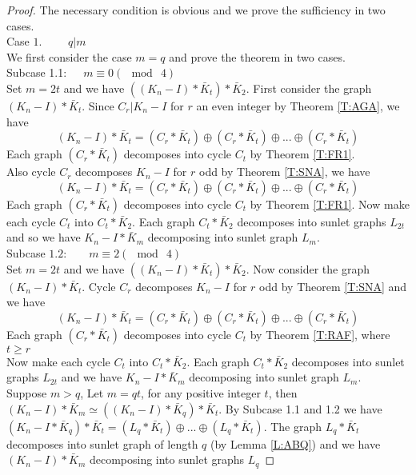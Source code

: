 \documentclass[12pt]{report}
\begin{document}
\begin{proof}
The necessary condition is obvious and we prove the sufficiency in two cases.\\
Case $1$.  \ \ \ \ $ q|m$\\
We first consider the case $m=q$ and prove the theorem in two cases.\\
Subcase 1.1:\ \ \ $m\equiv 0(\mod \  4)$\\
Set $m=2t$ and we have $((K_n-I)*\bar{K}_t)*\bar{K}_2$. First
consider the graph $(K_n-I)*\bar{K}_t$. Since  $C_r|K_n-I$ for $r$
an even integer by Theorem \ref{T:AGA}, we have
$$(K_n-I)*\bar{K}_t=(C_r*\bar{K}_t)\oplus
(C_r*\bar{K}_t)\oplus...\oplus(C_r*\bar{K}_t)$$
Each graph $(C_r*\bar{K}_t)$ decomposes into cycle $C_t$ by Theorem \ref{T:FR1}.\\
 Also cycle $C_r$ decomposes $K_n-I$ for $r$ odd by Theorem \ref{T:SNA}, we have $$(K_n-I)*\bar{K}_t=(C_r*\bar{K}_t)\oplus (C_r*\bar{K}_t)\oplus...\oplus (C_r*\bar{K}_t)$$
Each graph $(C_r*\bar{K}_t)$ decomposes into cycle $C_t$ by Theorem
\ref{T:FR1}. Now make each cycle $C_t$ into $C_t*\bar{K}_2$. Each
graph $C_t*\bar{K}_2$ decomposes into sunlet graphs $L_{2t}$ and so
we have  $K_n-I*\bar{K}_m$ decomposing into sunlet graph $L_m$.
\\
Subcase $1.2$:\ \ \ \ $m\equiv 2 (\mod\ 4)$\\
Set $m=2t$ and we have $((K_n-I)*\bar{K}_t)*\bar{K}_2$. Now consider
the graph $(K_n-I)*\bar{K}_t$. Cycle $C_r$ decomposes $K_n-I$ for
$r$ odd by Theorem \ref{T:SNA} and we have
$$(K_n-I)*\bar{K}_t=(C_r*\bar{K}_t)\oplus (C_r*\bar{K}_t)\oplus...\oplus(C_r*\bar{K}_t)$$
Each graph $(C_r*\bar{K}_t)$ decomposes into cycle $C_t$ by Theorem \ref{T:RAF}, where $t\geq r$\\
 Now make each cycle $C_t$ into $C_t*\bar{K}_2$. Each graph $C_t*\bar{K}_2$ decomposes into sunlet graphs $L_{2t}$ and we have  $K_n-I*\bar{K}_m$ decomposing into sunlet graph $L_m$.\\
Suppose $m>q$, Let $m=qt$, for any positive integer $t$, then
$(K_n-I)*\bar{K}_m\simeq ((K_n-I)*\bar{K}_q)*\bar{K}_t$. By Subcase
1.1 and 1.2 we have  $(K_n-I*\bar{K}_q)*\bar{K}_t=(L_q*\bar{K}_t)
\oplus ...\oplus (L_q*\bar{K}_t)$. The graph $L_q*\bar{K}_t$
decomposes into sunlet graph of length $q$ (by Lemma \ref{L:ABQ})
and we have $(K_n-I)*\bar{K}_m$ decomposing into sunlet graphs $L_q$

\end{proof}
\end{document}
